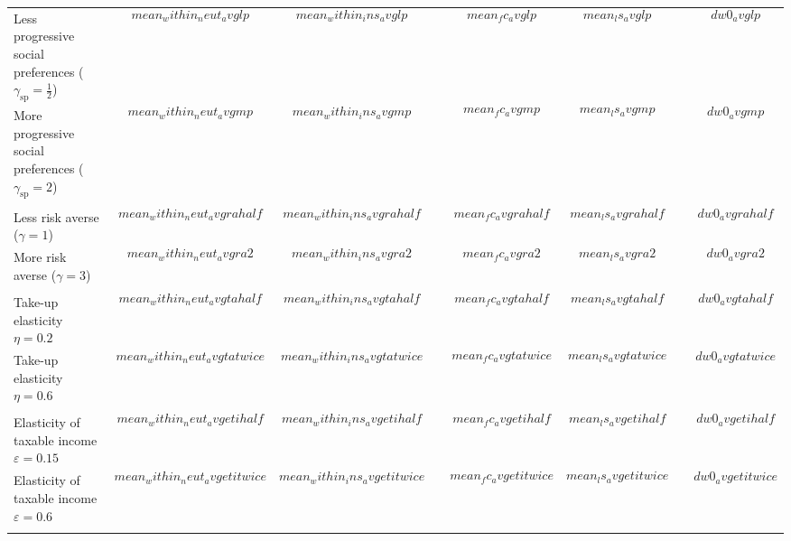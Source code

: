 \begin{tabular*}{1.38\textwidth}{@{\extracolsep{\fill}}lccccccc}
Less progressive social preferences ($\gamma_{\text{sp}} = \frac{1}{2}$) & $$mean_within_neut_avglp$$ & $$mean_within_ins_avglp$$         & & $$mean_fc_avglp$$
& $$mean_ls_avglp$$ &         & $$dw0_avglp$$ \\
More progressive social preferences ($\gamma_{\text{sp}} = 2$)
& $$mean_within_neut_avgmp$$ & $$mean_within_ins_avgmp$$ &          & $$mean_fc_avgmp$$
& $$mean_ls_avgmp$$            & & $$dw0_avgmp$$ \\ \\

Less risk averse ($\gamma = 1$)
& $$mean_within_neut_avgrahalf$$  & $$mean_within_ins_avgrahalf$$  &
& $$mean_fc_avgrahalf$$    & $$mean_ls_avgrahalf$$         & & $$dw0_avgrahalf$$ \\
More risk averse ($\gamma = 3$)
& $$mean_within_neut_avgra2$$ & $$mean_within_ins_avgra2$$    &      & $$mean_fc_avgra2$$
& $$mean_ls_avgra2$$             & & $$dw0_avgra2$$ \\
\\

Take-up elasticity $\eta = 0.2$
& $$mean_within_neut_avgtahalf$$ & $$mean_within_ins_avgtahalf$$ &
& $$mean_fc_avgtahalf$$ & $$mean_ls_avgtahalf$$ &
& $$dw0_avgtahalf$$  \\
Take-up elasticity $\eta = 0.6$
& $$mean_within_neut_avgtatwice$$  & $$mean_within_ins_avgtatwice$$ &
& $$mean_fc_avgtatwice$$ & $$mean_ls_avgtatwice$$ & &
$$dw0_avgtatwice$$  \\ 
\\
Elasticity of taxable income $\varepsilon = 0.15$ & $$mean_within_neut_avgetihalf$$
& $$mean_within_ins_avgetihalf$$ &
& $$mean_fc_avgetihalf$$ & $$mean_ls_avgetihalf$$ 
& & $$dw0_avgetihalf$$  \\
Elasticity of taxable income $\varepsilon = 0.6$ & $$mean_within_neut_avgetitwice$$
& $$mean_within_ins_avgetitwice$$ &
& $$mean_fc_avgetitwice$$ & $$mean_ls_avgetitwice$$ & 
& $$dw0_avgetitwice$$  \\ \addlinespace
\bottomrule
\end{tabular*}

